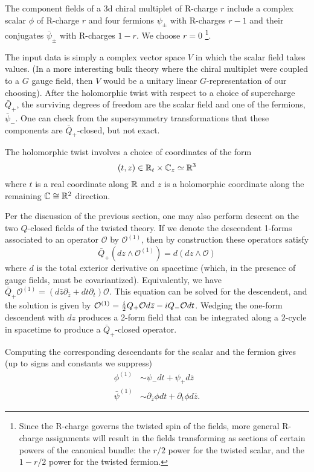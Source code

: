\documentclass[11pt]{amsart}
\begin{document}
The component fields of a 3d chiral multiplet of R-charge $r$ include a complex scalar $\phi$ of R-charge $r$ and four fermions $\psi_{\pm}$ with R-charges  $r-1$ and their conjugates $\bar{\psi}_{\pm}$ with R-charges $1-r$. We choose $r=0$ \footnote{Since the R-charge governs the twisted spin of the fields, more general R-charge assignments will result in the fields transforming as sections of certain powers of the canonical bundle: the $r/2$ power for the twisted scalar, and the $1-r/2$ power for the twisted fermion.}.  

The input data is simply a complex vector space $V$ in which the scalar field takes values. (In a more interesting bulk theory where the chiral multiplet were coupled to a $G$ gauge field, then $V$ would be a unitary linear $G$-representation of our choosing). After the holomorphic twist with respect to a choice of supercharge $\bar{Q}_+$, the surviving degrees of freedom are the scalar field and one of the fermions, $\bar{\psi}_-$. One can check from the supersymmetry transformations that these components are $\bar{Q}_+$-closed, but not exact. 

The holomorphic twist involves a choice of coordinates of the form
\[
(t , z) \in \mathbb R_t \times \mathbb C_z \simeq \mathbb R^3
\]
where $t$ is a real coordinate along $\mathbb R$ and $z$ is a holomorphic coordinate along the remaining $\mathbb C \cong \mathbb R^2$ direction. 

Per the discussion of the previous section, one may also perform descent on the two $Q$-closed fields of the twisted theory. If we denote the descendent 1-forms associated to an operator $\mathcal{O}$ by $\mathcal{O}^{(1)}$, then by construction these operators satisfy
\[
\bar{Q}_+(dz \wedge \mathcal{O}^{(1)}) = d (dz \wedge \mathcal{O})
\]
where $d$ is the total exterior derivative on spacetime (which, in the presence of gauge fields, must be covariantized). Equivalently, we have $\bar{Q}_{+}\mathcal{O}^{(1)} = (d\bar{z}\partial_{\bar{z}} + dt \partial_t)\mathcal{O}$. This equation can be solved for the descendent, and the solution is given by $\mathcal{O}^{(1)} = {i \over 2}Q_+ \mathcal{O} d\bar{z} - i Q_- \mathcal{O} dt$. Wedging the one-form descendent with $dz$ produces a 2-form field that can be integrated along a 2-cycle in spacetime to produce a $\bar{Q}_+$-closed operator. 

Computing the corresponding descendants for the scalar and the fermion gives (up to signs and constants we suppress)
\begin{align}
\phi^{(1)} &\sim \psi_{-}dt + \psi_+ d\bar{z} \\
\bar{\psi}^{(1)} &\sim \partial_{\bar{z}}\phi dt + \partial_t \phi d\bar{z}.
\end{align}
\end{document}
